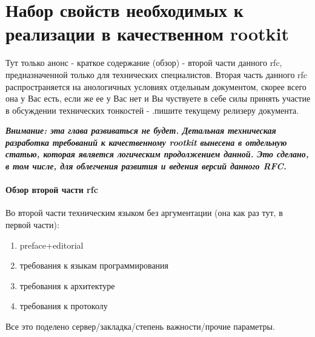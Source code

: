 \section{Набор свойств необходимых к реализации в качественном rootkit}
\label{tech_spec}

Тут только анонс - краткое содержание (обзор) - второй части данного rfc, предназначенной только
для технических специалистов. Вторая часть данного rfc распространяется на анологичных условиях
 отдельным документом, скорее всего она у Вас есть, если же ее у Вас нет и Вы чуствуете в себе
силы принять участие в обсуждении технических тонкостей - .пишите текущему релизеру документа.

%
{\sl\bf
  Внимание: эта глава развиваться не будет.
  Детальная техническая разработка требований к качественному rootkit
  вынесена в отдельную статью, которая является логическим продолжением
  данной. Это сделано, в том числе, для облегчения развития и ведения версий
  данного RFC.
}

\paragraph{Обзор второй части rfc\\}

Во второй части техническим языком без аргументации (она как раз тут, в первой части):

\begin{enumerate}
\item{preface+editorial}
\item{требования к языкам программирования}
\item{требования к архитектуре}
\item{требования к протоколу}
\end{enumerate}

Все это поделено сервер/закладка/степень важности/прочие параметры.
